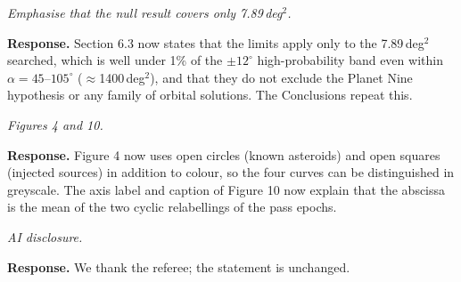 \documentclass[11pt]{article}
\newenvironment{referee}{\par\color{black!60}\itshape}{\par}
\newcommand{\resp}{\par\noindent\textbf{Response.} }
\begin{document}
\begin{referee}
Emphasise that the null result covers only 7.89\,deg$^2$.
\end{referee}
\resp Section 6.3 now states that the limits apply only to the 7.89\,deg$^2$ searched, which is well under 1\% of the $\pm12^\circ$ high-probability band even within $\alpha = 45$--$105^\circ$ ($\approx$1400\,deg$^2$), and that they do not exclude the Planet Nine hypothesis or any family of orbital solutions. The Conclusions repeat this.

\begin{referee}
Figures 4 and 10.
\end{referee}
\resp Figure 4 now uses open circles (known asteroids) and open squares (injected sources) in addition to colour, so the four curves can be distinguished in greyscale. The axis label and caption of Figure 10 now explain that the abscissa is the mean of the two cyclic relabellings of the pass epochs.

\begin{referee}
AI disclosure.
\end{referee}
\resp We thank the referee; the statement is unchanged.
\end{document}
